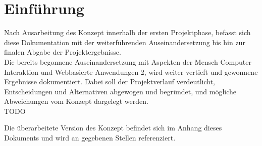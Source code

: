 
\chapter{Einführung}
Nach Ausarbeitung des Konzept innerhalb der ersten Projektphase, befasst sich diese Dokumentation mit der weiterführenden Auseinandersetzung bis hin zur finalen Abgabe der Projektergebnisse.\\

Die bereits begonnene Auseinandersetzung mit Aspekten der Mensch Computer Interaktion und Webbasierte Anwendungen 2, wird weiter vertieft und gewonnene Ergebnisse dokumentiert.
Dabei soll der Projektverlauf verdeutlicht, Entscheidungen und Alternativen abgewogen und begründet, und mögliche Abweichungen vom Konzept dargelegt werden.\\

TODO

Die überarbeitete Version des Konzept befindet sich im Anhang dieses Dokuments und wird an gegebenen Stellen referenziert.

